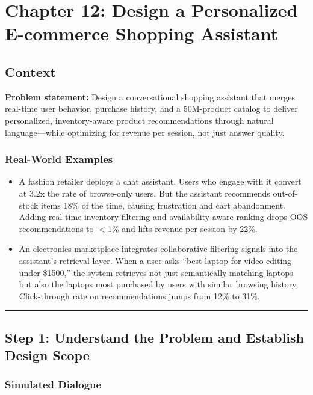 \chapter{Chapter 12: Design a Personalized E-commerce Shopping Assistant}

\section*{Context}

\textbf{Problem statement:} Design a conversational shopping assistant that merges real-time user behavior, purchase history, and a 50M-product catalog to deliver personalized, inventory-aware product recommendations through natural language---while optimizing for revenue per session, not just answer quality.

\subsection*{Real-World Examples}

\begin{itemize}
  \item A fashion retailer deploys a chat assistant. Users who engage with it convert at 3.2x the rate of browse-only users. But the assistant recommends out-of-stock items 18\% of the time, causing frustration and cart abandonment. Adding real-time inventory filtering and availability-aware ranking drops OOS recommendations to $<$1\% and lifts revenue per session by 22\%.
  \item An electronics marketplace integrates collaborative filtering signals into the assistant's retrieval layer. When a user asks ``best laptop for video editing under \$1500,'' the system retrieves not just semantically matching laptops but also the laptops most purchased by users with similar browsing history. Click-through rate on recommendations jumps from 12\% to 31\%.
\end{itemize}

\bigskip\hrule\bigskip

\section*{Step 1: Understand the Problem and Establish Design Scope}

\subsection*{Simulated Dialogue}

